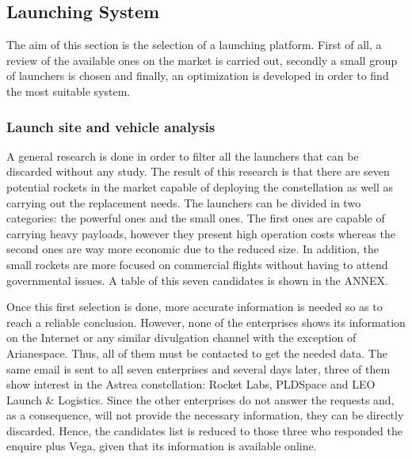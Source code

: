 \subsection{Launching System}
The aim of this section is the selection of a launching platform. First of all, a review of the available ones on the market is carried out, secondly a small group of launchers is chosen and finally, an optimization is developed in order to find the most suitable system. 

\subsubsection{Launch site and vehicle analysis}
A general research is done in order to filter all the launchers that can be discarded without any study. The result of this research is that there are seven potential rockets in the market capable of deploying the constellation as well as carrying out the replacement needs. The launchers can be divided in two categories: the powerful ones and the small ones. The first ones are capable of carrying heavy payloads, however they present high operation costs whereas the second ones are way more economic due to the reduced size. In addition, the small rockets are more focused on commercial flights without having to attend governmental issues. A table of this seven candidates is shown in the ANNEX.

Once this first selection is done, more accurate information is needed so as to reach a reliable conclusion. However, none of the enterprises shows its information on the Internet or any similar divulgation channel with the exception of Arianespace. Thus, all of them must be contacted to get the needed data. The same email is sent to all seven enterprises and several days later, three of them show interest in the Astrea constellation: Rocket Labs, PLDSpace and LEO Launch \& Logistics. Since the other enterprises do not answer the requests and, as a consequence, will not provide the necessary information, they can be directly discarded. Hence, the candidates list is reduced to those three who responded the enquire plus Vega, given that its information is available online. 

